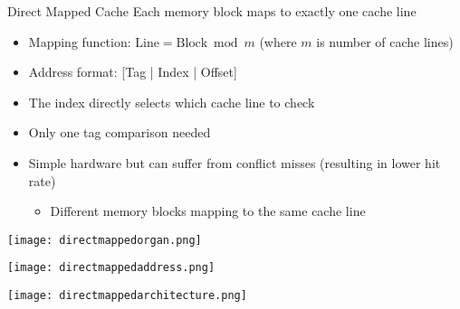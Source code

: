 \begin{concept}{Direct Mapped Cache}
    Each memory block maps to exactly one cache line
\begin{itemize}
    \item Mapping function: $\text{Line} = \text{Block} \bmod m$ (where $m$ is number of cache lines)
    \item Address format: [Tag | Index | Offset]
    \item The index directly selects which cache line to check
    \item Only one tag comparison needed
    \item Simple hardware but can suffer from conflict misses (resulting in lower hit rate)
    \begin{itemize}
        \item Different memory blocks mapping to the same cache line
    \end{itemize}
\end{itemize}


\begin{center}

\texttt{[image: directmappedorgan.png]}

\texttt{[image: directmappedaddress.png]}

\texttt{[image: directmappedarchitecture.png]}
\end{center}
\end{concept}



